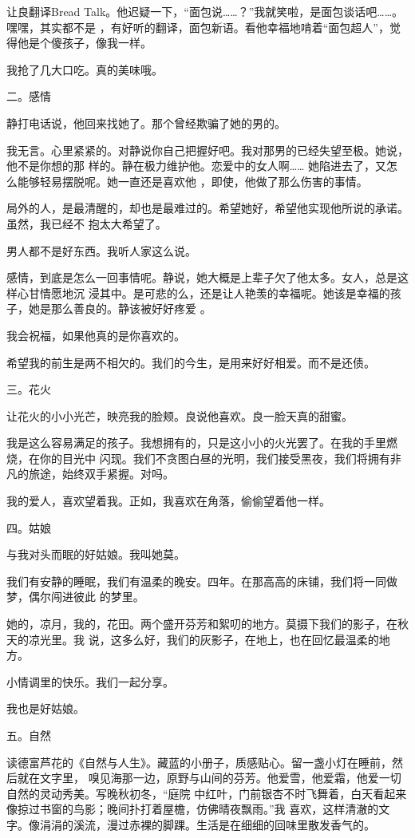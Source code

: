 \documentclass[12pt,a4paper]{article}
\newcommand{\subpart}[1]{
	\begingroup \par
	\vspace{1ex} \centering #1
	\par \endgroup \nopagebreak[4]
}
\begin{document}
		让良翻译Bread Talk。他迟疑一下，“面包说……？”我就笑啦，是面包谈话吧……。嘿嘿，其实都不是
	，有好听的翻译，面包新语。看他幸福地啃着“面包超人”，觉得他是个傻孩子，像我一样。

		我抢了几大口吃。真的美味哦。

		\subpart{二。感情}

		静打电话说，他回来找她了。那个曾经欺骗了她的男的。

		我无言。心里紧紧的。对静说你自己把握好吧。我对那男的已经失望至极。她说，他不是你想的那
	样的。静在极力维护他。恋爱中的女人啊…… 她陷进去了，又怎么能够轻易摆脱呢。她一直还是喜欢他
	，即使，他做了那么伤害的事情。

		局外的人，是最清醒的，却也是最难过的。希望她好，希望他实现他所说的承诺。虽然，我已经不
	抱太大希望了。

		男人都不是好东西。我听人家这么说。

		感情，到底是怎么一回事情呢。静说，她大概是上辈子欠了他太多。女人，总是这样心甘情愿地沉
	浸其中。是可悲的么，还是让人艳羡的幸福呢。她该是幸福的孩子，她是那么善良的。静该被好好疼爱
	。

		我会祝福，如果他真的是你喜欢的。

		希望我的前生是两不相欠的。我们的今生，是用来好好相爱。而不是还债。

		\subpart{三。花火}

		让花火的小小光芒，映亮我的脸颊。良说他喜欢。良一脸天真的甜蜜。

		我是这么容易满足的孩子。我想拥有的，只是这小小的火光罢了。在我的手里燃烧，在你的目光中
	闪现。我们不贪图白昼的光明，我们接受黑夜，我们将拥有非凡的旅途，始终双手紧握。对吗。

		我的爱人，喜欢望着我。正如，我喜欢在角落，偷偷望着他一样。

		\subpart{四。姑娘}

		与我对头而眠的好姑娘。我叫她莫。

		我们有安静的睡眠，我们有温柔的晚安。四年。在那高高的床铺，我们将一同做梦，偶尔闯进彼此
	的梦里。

		她的，凉月，我的，花田。两个盛开芬芳和絮叨的地方。莫摄下我们的影子，在秋天的凉光里。我
	说，这多么好，我们的灰影子，在地上，也在回忆最温柔的地方。

		小情调里的快乐。我们一起分享。

		我也是好姑娘。

		\subpart{五。自然}

		读德富芦花的《自然与人生》。藏蓝的小册子，质感贴心。留一盏小灯在睡前，然后就在文字里，
	嗅见海那一边，原野与山间的芬芳。他爱雪，他爱霜，他爱一切自然的灵动秀美。写晚秋初冬，“庭院
	中红叶，门前银杏不时飞舞着，白天看起来像掠过书窗的鸟影；晚间扑打着屋檐，仿佛晴夜飘雨。”我
	喜欢，这样清澈的文字。像涓涓的溪流，漫过赤裸的脚踝。生活是在细细的回味里散发香气的。
\end{document}
